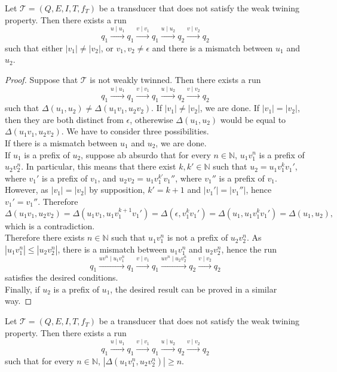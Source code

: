 \documentclass[envcountsame]{llncs}
\newcommand\delay{\Delta}
\newcommand\tra{\mathcal{T}}
\begin{document}
\begin{lemma}\label{choice_wtp0}
Let $\tra = (Q,E,I,T,f_T)$ be a transducer that does not satisfy the weak twining property.
Then there exists a run 
$$q_1 \xrightarrow{u\mid u_1} q_1 \xrightarrow{v\mid v_1} q_1 \xrightarrow{u\mid u_2} q_2 \xrightarrow{v\mid v_2} q_2$$
such that either $|v_1| \neq |v_2|$, or $v_1,v_2 \neq \epsilon$ and there is a mismatch between $u_1$ and $u_2$.
\end{lemma}

\begin{proof}
Suppose that $\tra$ is not weakly twinned.
Then there exists a run 
$$q_1 \xrightarrow{u\mid u_1} q_1 \xrightarrow{v\mid v_1} q_1 \xrightarrow{u\mid u_2} q_2 \xrightarrow{v\mid v_2} q_2$$
such that $\delay(u_1,u_2) \neq \delay(u_1v_1,u_2v_2)$.
If $|v_1| \neq |v_2|$, we are done. 
If $|v_1| = |v_2|$, then they are both distinct from $\epsilon$, otherewise $\delay(u_1,u_2)$ would be equal to $\delay(u_1v_1,u_2v_2)$.
We have to consider three possibilities.\\
If there is a mismatch between $u_1$ and $u_2$, we are done.\\
If $u_1$ is a prefix of $u_2$, suppose ab absurdo that for every $n \in \mathbb{N}$, $u_1v_1^n$ is a prefix of $u_2v_2^n$.
In particular, this means that there exist $k,k' \in \mathbb{N}$ such that $u_2 = u_1v_1^kv_1'$, where $v_1'$ is a prefix of $v_1$, and $u_2v_2 = u_1v_1^{k'}v_1''$, where $v_1''$ is a prefix of $v_1$.
However, as $|v_1| = |v_2|$ by supposition, $k' = k+1$ and $|v_1'| = |v_1''|$, hence $v_1'=v_1''$.
Therefore 
$$\delay(u_1v_1,u_2v_2) = \delay(u_1v_1,u_1v_1^{k+1}v_1') = \delay(\epsilon,v_1^{k}v_1') = \delay(u_1,u_1v_1^{k}v_1') = \delay(u_1,u_2),$$
which is a contradiction.\\
Therefore there exists $n \in \mathbb{N}$ such that $u_1v_1^n$ is not a prefix of $u_2v_2^n$.
As $|u_1v_1^n| \leq |u_2v_2^n|$, there is a mismatch between $u_1v_1^n$ and $u_2v_2^n$, hence the run
$$q_1 \xrightarrow{uv^n\mid  u_1v_1^n} q_1 \xrightarrow{v\mid v_1} q_1 \xrightarrow{uv^n\mid u_2v_2^n} q_2 \xrightarrow{v\mid v_2} q_2$$
satisfies the desired conditions.\\
Finally, if $u_2$ is a prefix of $u_1$, the desired result can be proved in a similar way.
\end{proof}

\begin{lemma}\label{choice_wtp}
Let $\tra = (Q,E,I,T,f_T)$ be a transducer that does not satisfy the weak twining property.
Then there exists a run $$q_1 \xrightarrow{u\mid u_1} q_1 \xrightarrow{v\mid v_1} q_1 \xrightarrow{u\mid u_2} q_2 \xrightarrow{v\mid v_2} q_2$$
such that for every $n \in \mathbb{N}$, $|\delay(u_1v_1^n,u_2v_2^n)| \geq n$.
\end{lemma}
\end{document}
